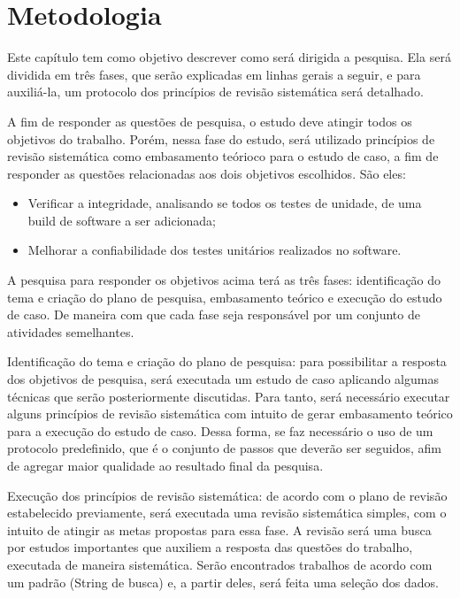 \chapter[Metodologia]{Metodologia}

Este capítulo tem como objetivo descrever como será dirigida a pesquisa.
Ela será dividida em três fases, que serão explicadas em linhas gerais a seguir,
e para auxiliá-la, um protocolo dos princípios de revisão sistemática será
detalhado.

A fim de responder as questões de pesquisa, o estudo deve atingir todos
os objetivos do trabalho. Porém, nessa fase do estudo, será utilizado princípios
de revisão sistemática como embasamento teórioco para o estudo de caso, a fim de
responder as questões relacionadas aos dois objetivos
escolhidos. São eles:

\begin{itemize}
\item Verificar a integridade, analisando se todos os testes de unidade, de uma build de software a ser adicionada;

\item Melhorar a confiabilidade dos testes unitários realizados no software.
\end{itemize}

A pesquisa para responder os objetivos acima terá as três fases:
identificação do tema e criação do plano de pesquisa, embasamento teórico e
execução do estudo de caso. De maneira com que cada fase seja
responsável por um conjunto de atividades semelhantes.

Identificação do tema e criação do plano de pesquisa: para possibilitar a
resposta dos objetivos de pesquisa, será executada um estudo de caso
aplicando algumas técnicas que serão posteriormente discutidas.
Para tanto, será necessário executar alguns princípios de revisão sistemática
com intuito de gerar embasamento teórico para a execução do estudo de caso.
Dessa forma, se faz necessário o uso de um protocolo predefinido, que é o
conjunto de passos que deverão ser seguidos, afim de agregar maior
qualidade ao resultado final da pesquisa.

Execução dos princípios de revisão sistemática: de acordo com o plano de revisão
estabelecido previamente, será executada uma revisão sistemática simples,
com o intuito
de atingir as metas propostas para essa fase. A revisão será uma busca por
estudos importantes que auxiliem a resposta das questões do trabalho, executada
de maneira sistemática. Serão encontrados trabalhos de acordo com um padrão
(String de busca) e, a partir deles, será feita uma seleção dos dados.

